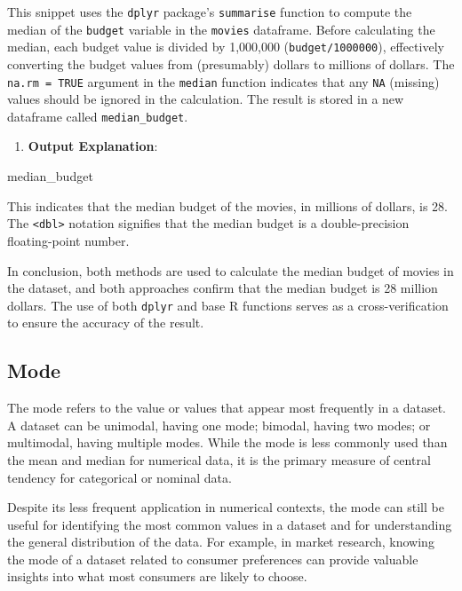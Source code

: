 \documentclass[
]{book}
\newenvironment{Shaded}{\begin{snugshade}}{\end{snugshade}}
\newcommand{\NormalTok}[1]{#1}
\providecommand{\tightlist}{%
  \setlength{\itemsep}{0pt}\setlength{\parskip}{0pt}}
\begin{document}
This snippet uses the \texttt{dplyr} package's \texttt{summarise} function to compute the median of the \texttt{budget} variable in the \texttt{movies} dataframe. Before calculating the median, each budget value is divided by 1,000,000 (\texttt{budget/1000000}), effectively converting the budget values from (presumably) dollars to millions of dollars. The \texttt{na.rm\ =\ TRUE} argument in the \texttt{median} function indicates that any \texttt{NA} (missing) values should be ignored in the calculation. The result is stored in a new dataframe called \texttt{median\_budget}.

\begin{enumerate}
\def\labelenumi{\arabic{enumi}.}
\setcounter{enumi}{1}
\tightlist
\item
  \textbf{Output Explanation}:
\end{enumerate}

\begin{Shaded}
\begin{Highlighting}[]
\NormalTok{median\_budget}
\end{Highlighting}
\end{Shaded}

This indicates that the median budget of the movies, in millions of dollars, is 28. The \texttt{\textless{}dbl\textgreater{}} notation signifies that the median budget is a double-precision floating-point number.

In conclusion, both methods are used to calculate the median budget of movies in the dataset, and both approaches confirm that the median budget is 28 million dollars. The use of both \texttt{dplyr} and base R functions serves as a cross-verification to ensure the accuracy of the result.

\subsection*{Mode}\label{mode}

The mode refers to the value or values that appear most frequently in a dataset. A dataset can be unimodal, having one mode; bimodal, having two modes; or multimodal, having multiple modes. While the mode is less commonly used than the mean and median for numerical data, it is the primary measure of central tendency for categorical or nominal data.

Despite its less frequent application in numerical contexts, the mode can still be useful for identifying the most common values in a dataset and for understanding the general distribution of the data. For example, in market research, knowing the mode of a dataset related to consumer preferences can provide valuable insights into what most consumers are likely to choose.
\end{document}
